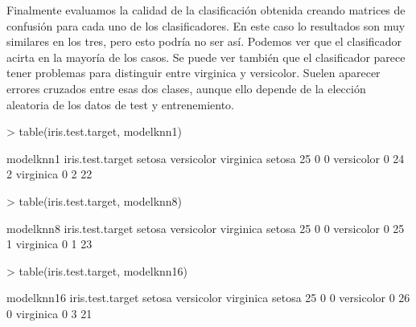 \documentclass [a4paper] {article}
\begin{document}
Finalmente evaluamos la calidad de la clasificación obtenida creando matrices de confusión para cada uno de los clasificadores.
En este caso lo resultados son muy similares en los tres, pero esto podría no ser así.
Podemos ver que el clasificador acirta en la mayoría de los casos.
Se puede ver también que el clasificador parece tener problemas para distinguir entre virginica y versicolor.
Suelen aparecer errores cruzados entre esas dos clases, aunque ello depende de la elección aleatoria de los datos de test y entrenemiento.
\begin{Schunk}
\begin{Sinput}
> table(iris.test.target, modelknn1)
\end{Sinput}
\begin{Soutput}
                modelknn1
iris.test.target setosa versicolor virginica
      setosa         25          0         0
      versicolor      0         24         2
      virginica       0          2        22
\end{Soutput}
\begin{Sinput}
> table(iris.test.target, modelknn8)
\end{Sinput}
\begin{Soutput}
                modelknn8
iris.test.target setosa versicolor virginica
      setosa         25          0         0
      versicolor      0         25         1
      virginica       0          1        23
\end{Soutput}
\begin{Sinput}
> table(iris.test.target, modelknn16)
\end{Sinput}
\begin{Soutput}
                modelknn16
iris.test.target setosa versicolor virginica
      setosa         25          0         0
      versicolor      0         26         0
      virginica       0          3        21
\end{Soutput}
\end{Schunk}

\newpage
\end{document}
